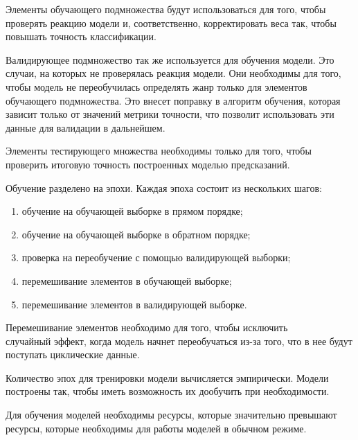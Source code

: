 Элементы обучающего подмножества будут использоваться для того, чтобы проверять реакцию модели и, соответственно, корректировать веса так, чтобы повышать точность классификации.

Валидирующее подмножество так же используется для обучения модели. Это случаи, на которых не проверялась реакция модели. Они необходимы для того, чтобы модель не переобучилась определять жанр только для элементов обучающего подмножества. Это внесет поправку в алгоритм обучения, которая зависит только от значений метрики точности, что позволит использовать эти данные для валидации в дальнейшем.

Элементы тестирующего множества необходимы только для того, чтобы проверить итоговую точность построенных моделью предсказаний.

Обучение разделено на эпохи. Каждая эпоха состоит из нескольких шагов:
\begin{enumerate}
  \item обучение на обучающей выборке в прямом порядке;
  \item обучение на обучающей выборке в обратном порядке;
  \item проверка на переобучение с помощью валидирующей выборки;
  \item перемешивание элементов в обучающей выборке;
  \item перемешивание элементов в валидирующей выборке.
\end{enumerate}

Перемешивание элементов необходимо для того, чтобы исключить \\случайный эффект, когда модель начнет переобучаться из-за того, что в нее будут поступать циклические данные.

Количество эпох для тренировки модели вычисляется эмпирически. Модели построены так, чтобы иметь возможность их дообучить при необходимости.

Для обучения моделей необходимы ресурсы, которые значительно превышают ресурсы, которые необходимы для работы моделей в обычном режиме.
